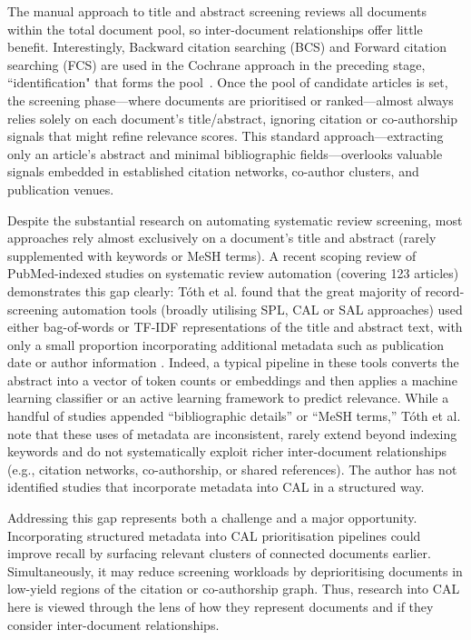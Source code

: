 \documentclass[10pt,oneside]{book}
\begin{document}
The manual approach to title and abstract screening reviews all documents within the total document pool, so inter-document relationships offer little benefit. Interestingly, Backward citation searching (BCS) and Forward citation searching (FCS) are used in the Cochrane approach in the preceding stage, ``identification" that forms the pool~\cite{briscoe_conduct_2020, noauthor_mecir_nodate}. Once the pool of candidate articles is set, the screening phase—where documents are prioritised or ranked—almost always relies solely on each document’s title/abstract, ignoring citation or co-authorship signals that might refine relevance scores. This standard approach—extracting only an article’s abstract and minimal bibliographic fields—overlooks valuable signals embedded in established citation networks, co-author clusters, and publication venues.

Despite the substantial research on automating systematic review screening, most approaches rely almost exclusively on a document’s title and abstract (rarely supplemented with keywords or MeSH terms). A recent scoping review of PubMed-indexed studies on systematic review automation (covering 123 articles) demonstrates this gap clearly: Tóth et al. found that the great majority of record-screening automation tools (broadly utilising SPL, CAL or SAL approaches) used either bag-of-words or TF-IDF representations of the title and abstract text, with only a small proportion incorporating additional metadata such as publication date or author information \cite{toth_automation_2024}. Indeed, a typical pipeline in these tools converts the abstract into a vector of token counts or embeddings and then applies a machine learning classifier or an active learning framework to predict relevance. While a handful of studies appended ``bibliographic details” or ``MeSH terms,” Tóth et al. note that these uses of metadata are inconsistent, rarely extend beyond indexing keywords and do not systematically exploit richer inter-document relationships (e.g., citation networks, co-authorship, or shared references). The author has not identified studies that incorporate metadata into CAL in a structured way. 

Addressing this gap represents both a challenge and a major opportunity. Incorporating structured metadata into CAL prioritisation pipelines could improve recall by surfacing relevant clusters of connected documents earlier. Simultaneously, it may reduce screening workloads by deprioritising documents in low-yield regions of the citation or co-authorship graph. Thus, research into CAL here is viewed through the lens of how they represent documents and if they consider inter-document relationships.  
\end{document}
